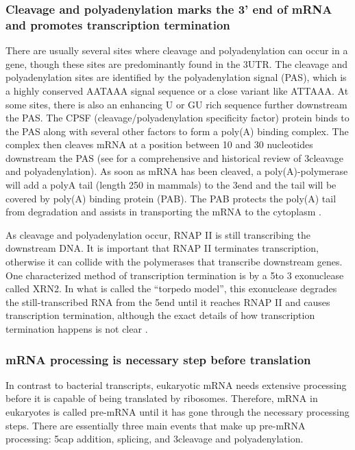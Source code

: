 \subsubsection{Cleavage and polyadenylation marks the 3' end of mRNA
and promotes transcription termination}
There are usually several sites where cleavage and polyadenylation can occur in
a gene, though these sites are predominantly found in the 3\p UTR. The cleavage
and polyadenylation sites are identified by the polyadenylation signal (PAS),
which is a highly conserved AATAAA signal sequence or a close variant like
ATTAAA. At some sites, there is also an enhancing U or GU rich sequence further
downstream the PAS. The CPSF (cleavage/polyadenylation specificity factor)
protein binds to the PAS along with several other factors to form a poly(A)
binding complex. The complex then cleaves mRNA at a position between 10 and 30
nucleotides downstream the PAS (see \cite{proudfoot_ending_2011} for a
comprehensive and historical review of 3\p cleavage and polyadenylation). As
soon as mRNA has been cleaved, a poly(A)-polymerase will add a polyA tail
(length 250 in mammals) to the 3\p end and the tail will be covered by poly(A)
binding protein (PAB). The PAB protects the poly(A) tail from degradation and
assists in transporting the mRNA to the cytoplasm
\cite{mangus_poly-binding_2003}.

As cleavage and polyadenylation occur, RNAP II is still transcribing the
downstream DNA. It is important that RNAP II terminates transcription,
otherwise it can collide with the polymerases that transcribe downstream genes.
One characterized method of transcription termination is by a 5\p to 3\p
exonuclease called XRN2. In what is called the ``torpedo model'', this
exonuclease degrades the still-transcribed RNA from the 5\p end until it
reaches RNAP II and causes transcription termination, although the exact
details of how transcription termination happens is not clear
\cite{kuehner_unravelling_2011}.

\subsubsection{mRNA processing is necessary step before translation}
In contrast to bacterial transcripts, eukaryotic mRNA needs extensive
processing before it is capable of being translated by ribosomes. Therefore,
mRNA in eukaryotes is called pre-mRNA until it has gone through the necessary
processing steps. There are essentially three main events that make up pre-mRNA
processing: 5\p cap addition, splicing, and 3\p cleavage and polyadenylation.

